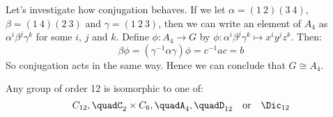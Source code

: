 \begin{enumerate}
        Let's investigate how conjugation behaves.
        If we let \(\alpha = (1\ 2)(3\ 4)\), \(\beta = (1\ 4)(2\ 3)\) and \(\gamma = (1\ 2\ 3)\), then we can write an
        element of \(A_4\) as \(\alpha^i\beta^j\gamma^k\) for some \(i\), \(j\) and \(k\).
        Define \(\phi:A_4 \to G\) by \(\phi:\alpha^i\beta^j\gamma^k \mapsto x^{i}y^{j}z^{k}\).
        Then:
        \[\beta\phi = (\gamma^{-1}\alpha\gamma)\phi = c^{-1}ac = b\]
        So conjugation acts in the same way.
        Hence we can conclude that \(G \cong A_4\).
\end{enumerate}

\begin{mdframed}[align=center,nobreak=true]
    \begin{center}
        Any group of order 12 is isomorphic to one of:
        \[
            C_{12}, \quad%
            C_2 \times C_6, \quad%
            A_4, \quad%
            D_{12} \quad \text{or} \quad%
            \Dic_{12}
        \]
    \end{center}
\end{mdframed}
